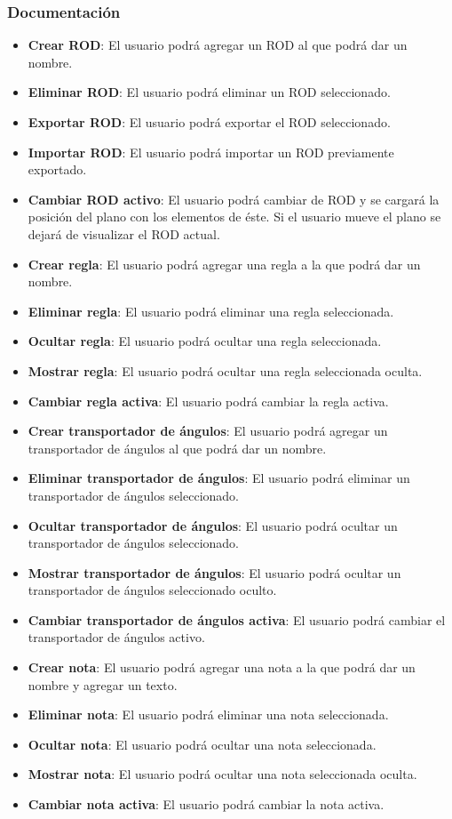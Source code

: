 \subsubsection{Documentación}

\begin{itemize}
	\item \textbf{Crear ROD}: El usuario podrá agregar un ROD al que podrá dar un nombre.
	\item \textbf{Eliminar ROD}: El usuario podrá eliminar un ROD seleccionado.
	\item \textbf{Exportar ROD}: El usuario podrá exportar el ROD seleccionado.
	\item \textbf{Importar ROD}: El usuario podrá importar un ROD previamente exportado.
	\item \textbf{Cambiar ROD activo}: El usuario podrá cambiar de ROD y se cargará la posición del plano con los elementos de éste. Si el usuario mueve el plano se dejará de visualizar el ROD actual.
	\item \textbf{Crear regla}: El usuario podrá agregar una regla a la que podrá dar un nombre.
	\item \textbf{Eliminar regla}: El usuario podrá eliminar una regla seleccionada.
	\item \textbf{Ocultar regla}: El usuario podrá ocultar una regla seleccionada.
	\item \textbf{Mostrar regla}: El usuario podrá ocultar una regla seleccionada oculta.
	\item \textbf{Cambiar regla activa}: El usuario podrá cambiar la regla activa.
	\item \textbf{Crear transportador de ángulos}: El usuario podrá agregar un transportador de ángulos al que podrá dar un nombre.
	\item \textbf{Eliminar transportador de ángulos}: El usuario podrá eliminar un transportador de ángulos seleccionado.
	\item \textbf{Ocultar transportador de ángulos}: El usuario podrá ocultar un transportador de ángulos seleccionado.
	\item \textbf{Mostrar transportador de ángulos}: El usuario podrá ocultar un transportador de ángulos seleccionado oculto.
	\item \textbf{Cambiar transportador de ángulos activa}: El usuario podrá cambiar el transportador de ángulos activo.
	\item \textbf{Crear nota}: El usuario podrá agregar una nota a la que podrá dar un nombre y agregar un texto.
	\item \textbf{Eliminar nota}: El usuario podrá eliminar una nota seleccionada.
	\item \textbf{Ocultar nota}: El usuario podrá ocultar una nota seleccionada.
	\item \textbf{Mostrar nota}: El usuario podrá ocultar una nota seleccionada oculta.
	\item \textbf{Cambiar nota activa}: El usuario podrá cambiar la nota activa.
\end{itemize}